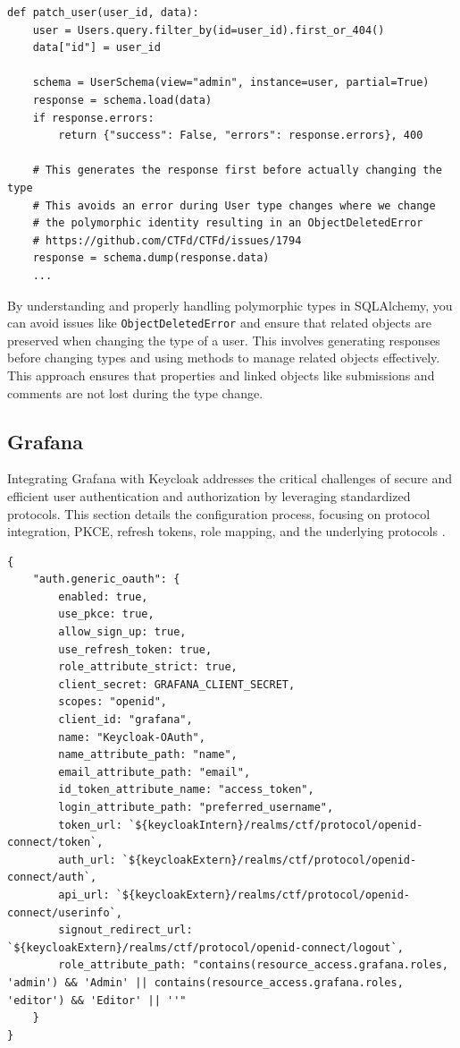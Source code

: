 \begin{verbatim}
def patch_user(user_id, data):
    user = Users.query.filter_by(id=user_id).first_or_404()
    data["id"] = user_id

    schema = UserSchema(view="admin", instance=user, partial=True)
    response = schema.load(data)
    if response.errors:
        return {"success": False, "errors": response.errors}, 400

    # This generates the response first before actually changing the type
    # This avoids an error during User type changes where we change
    # the polymorphic identity resulting in an ObjectDeletedError
    # https://github.com/CTFd/CTFd/issues/1794
    response = schema.dump(response.data)
    ...
\end{verbatim}

By understanding and properly handling polymorphic types in SQLAlchemy, you can avoid issues like \texttt{ObjectDeletedError} and ensure that related objects are preserved when changing the type of a user. This involves generating responses before changing types and using methods to manage related objects effectively. This approach ensures that properties and linked objects like submissions and comments are not lost during the type change.

\subsection{Grafana}\label{sec:grafana_auth}
Integrating Grafana with Keycloak addresses the critical challenges of secure and efficient user authentication and authorization by leveraging standardized protocols. This section details the configuration process, focusing on protocol integration, PKCE, refresh tokens, role mapping, and the underlying protocols \parencite{GrafanaKeycloak}.

\begin{verbatim}
{
    "auth.generic_oauth": {
        enabled: true,
        use_pkce: true,
        allow_sign_up: true,
        use_refresh_token: true,
        role_attribute_strict: true,
        client_secret: GRAFANA_CLIENT_SECRET,
        scopes: "openid",
        client_id: "grafana",
        name: "Keycloak-OAuth",
        name_attribute_path: "name",
        email_attribute_path: "email",
        id_token_attribute_name: "access_token",
        login_attribute_path: "preferred_username",
        token_url: `${keycloakIntern}/realms/ctf/protocol/openid-connect/token`,
        auth_url: `${keycloakExtern}/realms/ctf/protocol/openid-connect/auth`,
        api_url: `${keycloakExtern}/realms/ctf/protocol/openid-connect/userinfo`,
        signout_redirect_url: `${keycloakExtern}/realms/ctf/protocol/openid-connect/logout`,
        role_attribute_path: "contains(resource_access.grafana.roles, 'admin') && 'Admin' || contains(resource_access.grafana.roles, 'editor') && 'Editor' || ''"
    }
}
\end{verbatim}

